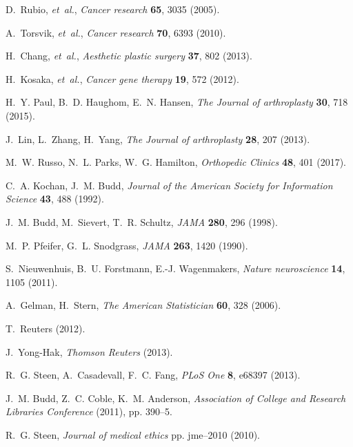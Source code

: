 \documentclass[12pt]{article}
\begin{document}
\clearpage

\begin{thebibliography}{10}

D.~Rubio, {\it et~al.\/}, {\it Cancer research\/} {\bf 65}, 3035 (2005).

A.~Torsvik, {\it et~al.\/}, {\it Cancer research\/} {\bf 70}, 6393 (2010).

H.~Chang, {\it et~al.\/}, {\it Aesthetic plastic surgery\/} {\bf 37}, 802
  (2013).

H.~Kosaka, {\it et~al.\/}, {\it Cancer gene therapy\/} {\bf 19}, 572 (2012).

H.~Y. Paul, B.~D. Haughom, E.~N. Hansen, {\it The Journal of arthroplasty\/}
  {\bf 30}, 718 (2015).

J.~Lin, L.~Zhang, H.~Yang, {\it The Journal of arthroplasty\/} {\bf 28}, 207
  (2013).

M.~W. Russo, N.~L. Parks, W.~G. Hamilton, {\it Orthopedic Clinics\/} {\bf 48},
  401 (2017).

C.~A. Kochan, J.~M. Budd, {\it Journal of the American Society for Information
  Science\/} {\bf 43}, 488 (1992).

J.~M. Budd, M.~Sievert, T.~R. Schultz, {\it JAMA\/} {\bf 280}, 296 (1998).

M.~P. Pfeifer, G.~L. Snodgrass, {\it JAMA\/} {\bf 263}, 1420 (1990).

S.~Nieuwenhuis, B.~U. Forstmann, E.-J. Wagenmakers, {\it Nature neuroscience\/}
  {\bf 14}, 1105 (2011).

A.~Gelman, H.~Stern, {\it The American Statistician\/} {\bf 60}, 328 (2006).

T.~Reuters  (2012).

J.~Yong-Hak, {\it Thomson Reuters\/}  (2013).

R.~G. Steen, A.~Casadevall, F.~C. Fang, {\it PLoS One\/} {\bf 8}, e68397
  (2013).

J.~M. Budd, Z.~C. Coble, K.~M. Anderson, {\it Association of College and
  Research Libraries Conference\/} (2011), pp. 390--5.

R.~G. Steen, {\it Journal of medical ethics\/} pp. jme--2010 (2010).


\end{thebibliography}
\end{document}

